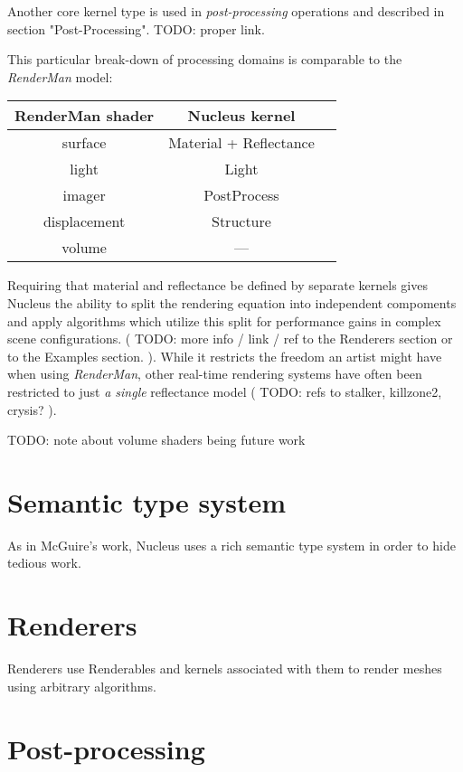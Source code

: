 Another core kernel type is used in \emph{post-processing} operations and described in section "Post-Processing". TODO: proper link.

This particular break-down of processing domains is comparable to the \emph{RenderMan} model:

\begin{center}
\begin{tabular}{ | c | c | c | }
\hline
RenderMan shader & Nucleus kernel \\
\hline
surface & Material + Reflectance \\
light & Light \\
imager & PostProcess \\
displacement & Structure \\
volume & --- \\
\hline
\end{tabular}
\end{center}

Requiring that material and reflectance be defined by separate kernels gives Nucleus the ability to split the rendering equation into independent compoments and apply algorithms which utilize this split for performance gains in complex scene configurations. ( TODO: more info / link / ref to the Renderers section or to the Examples section. ). While it restricts the freedom an artist might have when using \emph{RenderMan}, other real-time rendering systems have often been restricted to just \emph{a single} reflectance model ( TODO: refs to stalker, killzone2, crysis? ).

TODO: note about volume shaders being future work

\section{Semantic type system}

As in McGuire's work, Nucleus uses a rich semantic type system in order to hide tedious work.

\section{Renderers}

Renderers use Renderables and kernels associated with them to render meshes using arbitrary algorithms.

\section{Post-processing}


